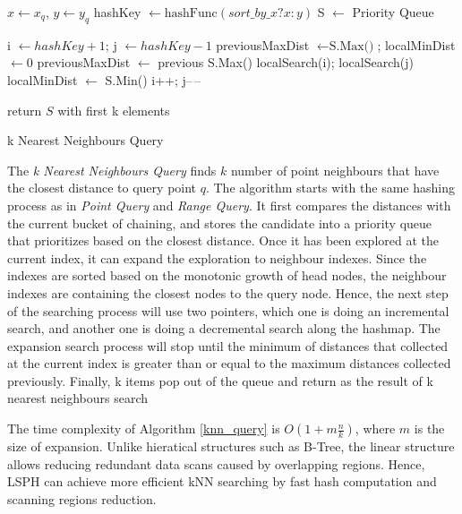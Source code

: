 \begin{algorithm}[H] \label{knn_query}
\SetAlgoLined
{}
$x\leftarrow{x_q}$, $y\leftarrow{y_q}$\;
hashKey $\leftarrow{\text{hashFunc}(sort\_by\_x ? x : y)}$\;
S $\leftarrow$ Priority Queue\;




i $\leftarrow{hashKey+1}$; 
j $\leftarrow{hashKey-1}$\; 
previousMaxDist $\leftarrow{\text{S.Max()}}$;
localMinDist $\leftarrow{0}$\;
 {
    previousMaxDist $\leftarrow$ previous S.Max()\;
    localSearch(i); localSearch(j)\;
    localMinDist $\leftarrow$ S.Min()\;
    i++; j--\,--\;
 }
 
 
 return $S$ with first k elements\;
 \caption{k Nearest Neighbours Query}
\end{algorithm}

The \textit{k Nearest Neighbours Query} finds $k$ number of point neighbours that have the closest distance to query point $q$. The algorithm starts with the same hashing process as in \textit{Point Query} and \textit{Range Query}. It first compares the distances with the current bucket of chaining, and stores the candidate into a priority queue that prioritizes based on the closest distance. Once it has been explored at the current index, it can expand the exploration to neighbour indexes. Since the indexes are sorted based on the monotonic growth of head nodes, the neighbour indexes are containing the closest nodes to the query node. Hence, the next step of the searching process will use two pointers, which one is doing an incremental search, and another one is doing a decremental search along the hashmap. The expansion search process will stop until the minimum of distances that collected at the current index is greater than or equal to the maximum distances collected previously.  Finally, k items pop out of the queue and return as the result of k nearest neighbours search

The time complexity of Algorithm \ref{knn_query} is $O(1 + m\frac{n}{k})$, where $m$ is the size of expansion. Unlike hieratical structures such as B-Tree, the linear structure allows reducing redundant data scans caused by overlapping regions. Hence, LSPH can achieve more efficient kNN searching by fast hash computation and scanning regions reduction. 

